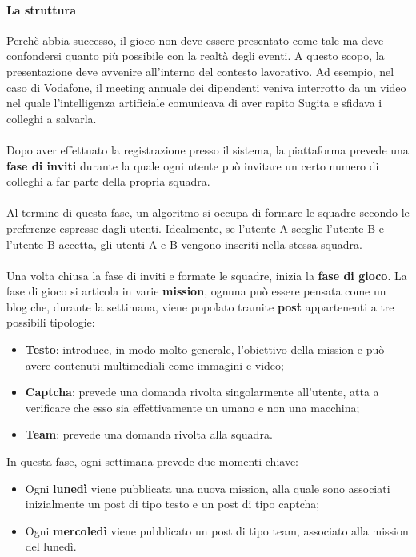 \paragraph{La struttura}
\label{par:struttura-plot}
Perchè abbia successo, il gioco non deve essere presentato come tale ma deve confondersi quanto più possibile con la realtà degli eventi. A questo scopo, la presentazione deve avvenire all'interno del contesto lavorativo. Ad esempio, nel caso di Vodafone, il meeting annuale dei dipendenti veniva interrotto da un video nel quale l'intelligenza artificiale comunicava di aver rapito Sugita e sfidava i colleghi a salvarla.
\\ \\
Dopo aver effettuato la registrazione presso il sistema, la piattaforma prevede una \textbf{fase di inviti} durante la quale ogni utente può invitare un certo numero di colleghi a far parte della propria squadra.
\\ \\
Al termine di questa fase, un algoritmo si occupa di formare le squadre secondo le preferenze espresse dagli utenti. Idealmente, se l'utente A sceglie l’utente B e l’utente B accetta, gli utenti A e B vengono inseriti nella stessa squadra.
\\ \\
Una volta chiusa la fase di inviti e formate le squadre, inizia la \textbf{fase di gioco}. 
La fase di gioco si articola in varie \textbf{mission}, ognuna può essere pensata come un blog che, durante la settimana, viene popolato tramite \textbf{post} appartenenti a tre possibili tipologie: 
\begin{itemize}
	\item \textbf{Testo}: introduce, in modo molto generale, l’obiettivo della mission e può avere contenuti multimediali come immagini e video;
	\item \textbf{Captcha}: prevede una domanda rivolta singolarmente all'utente, atta a verificare che esso sia effettivamente un umano e non una macchina;
	\item \textbf{Team}: prevede una domanda rivolta alla squadra. 
\end{itemize}

In questa fase, ogni settimana prevede due momenti chiave:
\begin{itemize}
	\item Ogni \textbf{lunedì} viene pubblicata una nuova mission, alla quale sono associati inizialmente un post di tipo testo e un post di tipo captcha;
	\item Ogni \textbf{mercoledì} viene pubblicato un post di tipo team, associato alla mission del lunedì.
\end{itemize}

